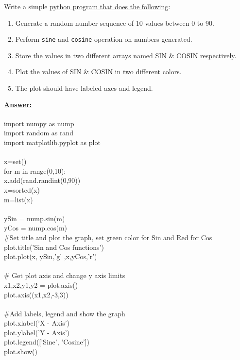 \documentclass{WeSTassignment}
\begin{document}
Write a simple \underline{python program that does the following}:
\begin{enumerate}
\item Generate a random number sequence of 10 values between 0 to 90. 
\item Perform \texttt{sine} and \texttt{cosine} operation on numbers generated. 
\item Store the values in two different arrays named SIN \& COSIN respectively. 
\item Plot the values of SIN \& COSIN in two different colors. 
\item The plot should have labeled axes and legend.
\end{enumerate}

\underline{\textbf{Answer:}}\\ \\
import numpy as nump\\
import random as rand\\
import matplotlib.pyplot as plot\\ \\
x=set()\\
for m in range(0,10):\\
	x.add(rand.randint(0,90))\\
x=sorted(x)\\
m=list(x)\\ \\
ySin = nump.sin(m)\\
yCos = nump.cos(m)\\
\#Set title and plot the graph, set green color for Sin and Red for Cos\\
plot.title('Sin and Cos functions')\\
plot.plot(x, ySin,'g' ,x,yCos,'r')\\ \\
\# Get plot axis and change y axis limits\\
x1,x2,y1,y2 = plot.axis()\\
plot.axis((x1,x2,-3,3))\\ \\
\#Add labels, legend and show the graph\\
plot.xlabel('X - Axis')\\
plot.ylabel('Y - Axis')\\
plot.legend(['Sine', 'Cosine'])\\
plot.show()\\


\makefooter
\end{document}
